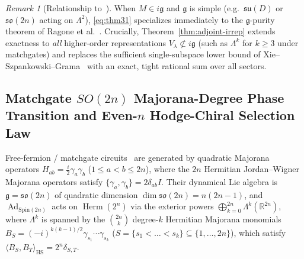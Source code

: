\documentclass[11pt,a4paper]{article}
\theoremstyle{definition}
\theoremstyle{remark}
\newtheorem{remark}[theorem]{Remark}
\newcommand{\RR}{\mathbb{R}}
\newcommand{\Ad}{\operatorname{Ad}}
\newcommand{\HS}{\mathrm{HS}}
\newcommand{\Herm}{\operatorname{Herm}}
\newcommand{\so}{\mathfrak{so}}
\newcommand{\su}{\mathfrak{su}}
\newcommand{\lieg}{\mathfrak{g}}
\begin{document}
\begin{remark}[Relationship to~\cite{ragone2024lie,xie2026structure}]
When $M \in i\lieg$ and $\lieg$ is simple (e.g.\ $\su(D)$ or $\so(2n)$ acting on $\Lambda^2$), \eqref{eq:thm31} specializes immediately to the $\lieg$-purity theorem of Ragone et al.~\cite{ragone2024lie}. Crucially, Theorem~\ref{thm:adjoint-irrep} extends exactness to \emph{all} higher-order representations $V_\lambda \not\subset i\lieg$ (such as $\Lambda^k$ for $k \ge 3$ under matchgates) and replaces the sufficient single-subspace lower bound of Xie--Szpankowski--Grama~\cite{xie2026structure} with an exact, tight rational sum over all sectors.
\end{remark}

\subsection{Matchgate \texorpdfstring{$SO(2n)$}{SO(2n)} Majorana-Degree Phase Transition and Even-\texorpdfstring{$n$}{n} Hodge-Chiral Selection Law}

Free-fermion / matchgate circuits~\cite{valiant2002quantum,terhal2002classical} are generated by quadratic Majorana operators $H_{ab} = \frac{i}{2}\gamma_a\gamma_b$ ($1 \le a < b \le 2n$), where the $2n$ Hermitian Jordan--Wigner Majorana operators satisfy $\{\gamma_a, \gamma_b\} = 2\delta_{ab} I$. Their dynamical Lie algebra is $\lieg = \so(2n)$ of quadratic dimension $\dim\so(2n) = n(2n-1)$, and $\Ad_{\mathrm{Spin}(2n)}$ acts on $\Herm(2^n)$ via the exterior powers $\bigoplus_{k=0}^{2n} \Lambda^k(\RR^{2n})$, where $\Lambda^k$ is spanned by the $\binom{2n}{k}$ degree-$k$ Hermitian Majorana monomials $B_S = (-i)^{k(k-1)/2}\gamma_{s_1}\cdots\gamma_{s_k}$ ($S = \{s_1 < \dots < s_k\} \subseteq \{1,\dots,2n\}$), which satisfy $\langle B_S, B_T\rangle_{\HS} = 2^n \delta_{S,T}$.
\end{document}
